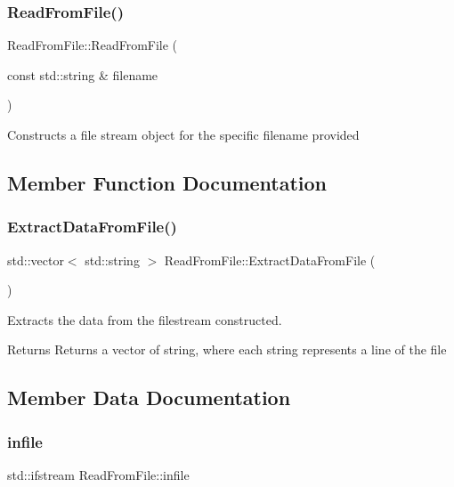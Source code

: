\subsubsection{\texorpdfstring{Read\+From\+File()}{ReadFromFile()}}
{\footnotesize\ttfamily Read\+From\+File\+::\+Read\+From\+File (\begin{DoxyParamCaption}\item[{const std\+::string \&}]{filename }\end{DoxyParamCaption})}

Constructs a file stream object for the specific filename provided 

\subsection{Member Function Documentation}
\mbox{\label{class_read_from_file_af04c3cbdbd3931d6171370ab8756c68d}} 
\subsubsection{\texorpdfstring{Extract\+Data\+From\+File()}{ExtractDataFromFile()}}
{\footnotesize\ttfamily std\+::vector$<$ std\+::string $>$ Read\+From\+File\+::\+Extract\+Data\+From\+File (\begin{DoxyParamCaption}{ }\end{DoxyParamCaption})}



Extracts the data from the filestream constructed. 

\begin{DoxyReturn}{Returns}
Returns a vector of string, where each string represents a line of the file 
\end{DoxyReturn}


\subsection{Member Data Documentation}
\mbox{\label{class_read_from_file_a086ac29a97a4e98206969e1ea7f4a608}} 
\subsubsection{\texorpdfstring{infile}{infile}}
{\footnotesize\ttfamily std\+::ifstream Read\+From\+File\+::infile\hspace{0.3cm}{\ttfamily [private]}}

